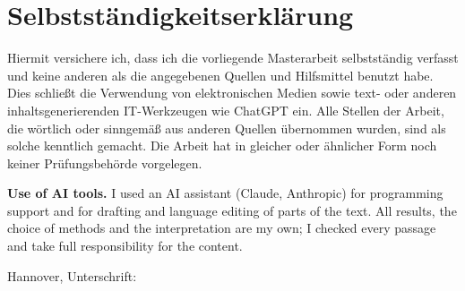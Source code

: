 \documentclass[12pt, a4paper, twoside]{report}
\begin{document}
\newpage
{}

\providecommand{\ansysfigdir}{../assets/}



% 
% 
\providecommand{\ansysfigdir}{../assets/}





\appendix




\newpage
\chapter*{Selbstständigkeitserklärung}

Hiermit versichere ich, dass ich die vorliegende Masterarbeit selbstständig
verfasst und keine anderen als die angegebenen Quellen und Hilfsmittel benutzt
habe. Dies schließt die Verwendung von elektronischen Medien sowie text- oder
anderen inhaltsgenerierenden IT-Werkzeugen wie ChatGPT ein. Alle Stellen der
Arbeit, die wörtlich oder sinngemäß aus anderen Quellen übernommen wurden, sind
als solche kenntlich gemacht. Die Arbeit hat in gleicher oder ähnlicher Form
noch keiner Prüfungsbehörde vorgelegen.

\medskip\noindent\textbf{Use of AI tools.} I used an AI assistant (Claude,
Anthropic) for programming support and for drafting and language editing of
parts of the text. All results, the choice of methods and the interpretation
are my own; I checked every passage and take full responsibility for the
content.

\vspace{2cm}
\noindent
Hannover, \underline{\hspace{4cm}} \hfill
Unterschrift: \underline{\hspace{5cm}}
\end{document}

